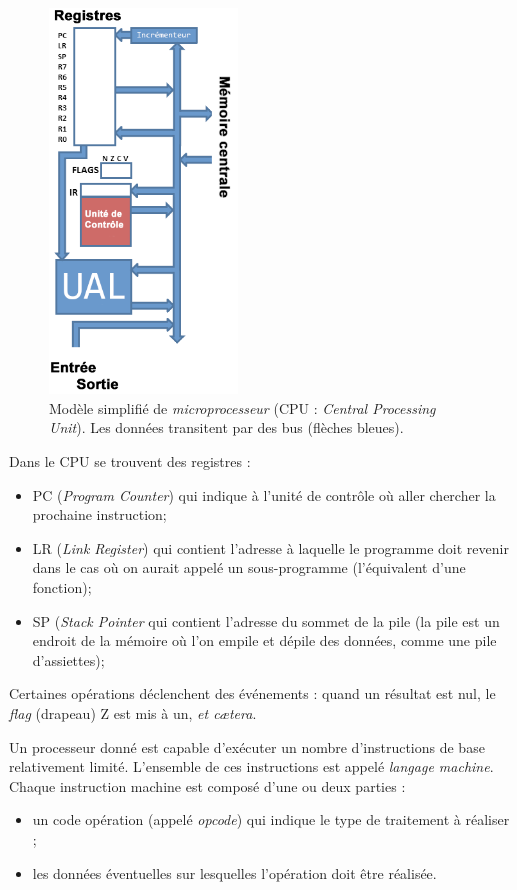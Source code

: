 \begin{figure}[H]
    \begin{center}
        \includegraphics[width=5cm]{ch-turing/img/vn2.png}
    \end{center}
    \caption*{Modèle simplifié de \textit{microprocesseur} (CPU : \textit{Central Processing Unit}).
        Les données transitent par des bus (flèches bleues).}
\end{figure}



Dans le CPU se trouvent des registres :
\begin{itemize}
    \item 	PC (\textit{Program Counter}) qui indique à l'unité de contrôle où aller chercher la prochaine instruction;
    \item 	LR	(\textit{Link Register}) qui contient l'adresse à laquelle le programme doit revenir dans le cas où on aurait appelé un sous-programme (l'équivalent d'une fonction);
    \item 	SP (\textit{Stack Pointer} qui contient l'adresse du sommet de la pile (la pile est un endroit de la mémoire où l'on \og empile\fg{} et \og dépile\fg{} des données, comme une pile d'assiettes);
\end{itemize}
Certaines opérations déclenchent des \og événements\fg{} : quand un résultat est nul, le \textit{flag} (drapeau) Z est mis à un, \textit{et c\ae tera}.

Un processeur donné est capable d'exécuter un nombre d'instructions de base relativement limité. L'ensemble de ces instructions est appelé \textit{langage machine}. Chaque instruction machine est composé d'une ou deux parties :
\begin{itemize}
    \item 	un code opération (appelé \textit{opcode}) qui indique le type de traitement à réaliser ;
    \item 	les données éventuelles sur lesquelles l'opération doit être réalisée.
\end{itemize}


